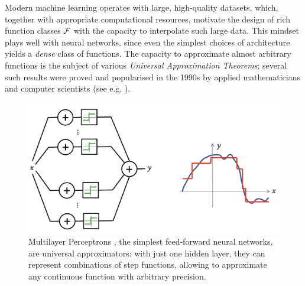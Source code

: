 Modern machine learning operates with large, high-quality datasets, which, together with appropriate computational resources, motivate the design of rich function classes ${\mathcal{F}}$ with the capacity to interpolate such large data. 
%
This 
mindset plays well with neural networks, since even the simplest choices of architecture yields a {\em dense} class of functions. 
%
The capacity to approximate almost arbitrary functions
is the subject of various \emph{Universal Approximation Theorems}; several such results were proved and popularised in the 1990s by applied mathematicians and computer scientists (see e.g. \cite{cybenko1989approximation,hornik1991approximation,barron1993universal,leshno1993multilayer,maiorov1999best,pinkus1999approximation}). 

\begin{figure}[h!]
    \centering
    \includegraphics[width=1\linewidth]{figures/ua_mlp.png}
    \caption{Multilayer Perceptrons \citep{rosenblatt1958perceptron}, the simplest feed-forward neural networks, are universal approximators: with just one hidden layer, they can represent combinations of step functions, allowing to approximate any continuous function with arbitrary precision.}
    \label{fig:ua_mlp}
\end{figure}%



